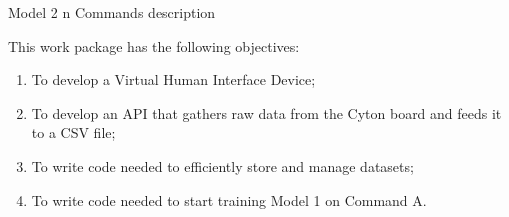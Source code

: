 
\begin{workpackage}{Model 2 n Commands}
  \label{wp:m2cN} %
description



  \makewptable %
    
  \begin{wpobjectives}
    This work package has the following objectives:
    \begin{enumerate}
    \item To develop a Virtual Human Interface Device;
    \item To develop an  API that gathers raw data from the Cyton board and feeds it 
to a CSV file;
    \item To write code needed to efficiently store and manage datasets;
    \item To write code needed to start training Model 1 on Command A.
    \end{enumerate}
  \end{wpobjectives}
  
  \begin{wpdescription}
 

    
  \end{wpdescription}
  

\end{workpackage}
